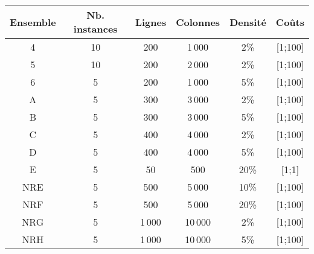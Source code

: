 \begin{tabular}{cccccc}
	\toprule
	Ensemble & Nb. instances & Lignes & Colonnes & Densité & Coûts\\
	\midrule
	4 & 10 & 200 & 1\,000 & 2\% & [1;100] \\
	5 & 10 & 200 & 2\,000 & 2\% & [1;100] \\
	6 & 5 & 200 & 1\,000 & 5\% & [1;100] \\
	A & 5 & 300 & 3\,000 & 2\% & [1;100] \\
	B & 5 & 300 & 3\,000 & 5\% & [1;100] \\
	C & 5 & 400 & 4\,000 & 2\% & [1;100] \\
	D & 5 & 400 & 4\,000 & 5\% & [1;100] \\
	E & 5 & 50 & 500 & 20\% & [1;1] \\
	NRE & 5 & 500 & 5\,000 & 10\% & [1;100] \\
	NRF & 5 & 500 & 5\,000 & 20\% & [1;100] \\
	NRG & 5 & 1\,000 & 10\,000 & 2\% & [1;100] \\
	NRH & 5 & 1\,000 & 10\,000 & 5\% & [1;100] \\
	\bottomrule
\end{tabular}
